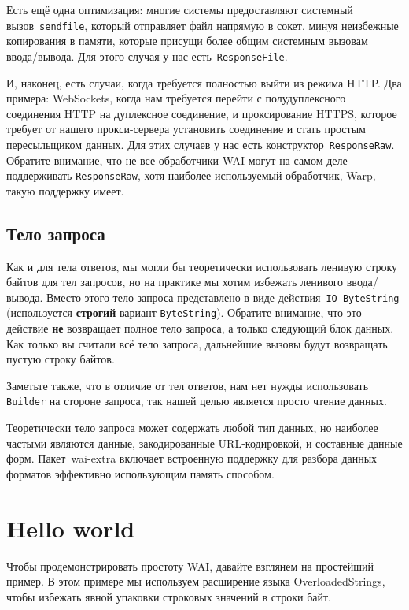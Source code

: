 Есть ещё одна оптимизация: многие системы предоставляют системный
вызов~\texttt{sendfile}, который отправляет файл напрямую в сокет, минуя
неизбежные копирования в памяти, которые присущи более общим системным вызовам
ввода/вывода. Для этого случая у нас есть~\lstinline'ResponseFile'.

И, наконец, есть случаи, когда требуется полностью выйти из режима HTTP. Два
примера: WebSockets, когда нам требуется перейти с полудуплексного соединения
HTTP на дуплексное соединение, и проксирование HTTPS, которое требует от нашего
прокси-сервера установить соединение и стать простым пересыльщиком данных. Для
этих случаев у нас есть конструктор~\lstinline'ResponseRaw'. Обратите внимание,
что не все обработчики WAI могут на самом деле поддерживать
\lstinline'ResponseRaw', хотя наиболее используемый обработчик, Warp, такую
поддержку имеет.

\subsection {Тело запроса}
Как и для тела ответов, мы могли бы теоретически использовать ленивую строку
байтов для тел запросов, но на практике мы хотим избежать ленивого
ввода/вывода. Вместо этого тело запроса представлено в виде
действия~\lstinline'IO ByteString' (используется \textbf{строгий} вариант
\lstinline'ByteString'). Обратите внимание, что это действие \textbf{не}
возвращает полное тело запроса, а только следующий блок данных. Как только вы
считали всё тело запроса, дальнейшие вызовы будут возвращать пустую строку
байтов.

Заметьте также, что в отличие от тел ответов, нам нет нужды использовать
\lstinline'Builder' на стороне запроса, так нашей целью является просто чтение
данных.

Теоретически тело запроса может содержать любой тип данных, но наиболее частыми
являются данные, закодированные URL-кодировкой, и составные данные форм.
Пакет~wai-extra включает встроенную поддержку для разбора данных форматов
эффективно использующим память способом.

\section{Hello world}
Чтобы продемонстрировать простоту WAI, давайте взглянем на простейший пример.
В этом примере мы используем расширение языка OverloadedStrings, чтобы избежать
явной упаковки строковых значений в строки байт.


